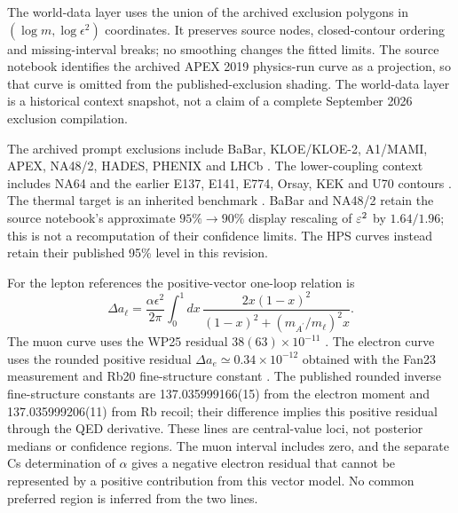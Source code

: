 The world-data layer uses the union of the archived exclusion polygons in
$(\log m,\log\epsilon^2)$ coordinates. It preserves source nodes, closed-contour
ordering and missing-interval breaks; no smoothing changes the fitted limits.
The source notebook identifies the archived APEX 2019 physics-run curve as
a projection, so that curve is omitted from the published-exclusion shading.
The world-data layer is a historical context snapshot, not a claim of a
complete September 2026 exclusion compilation.


The archived prompt exclusions include BaBar, KLOE/KLOE-2, A1/MAMI, APEX,
NA48/2, HADES, PHENIX and LHCb
\cite{BaBarDarkPhoton2014,KLOE2013,KLOE22015,A1MAMI2014,APEX2011,
NA48DarkPhoton2015,HADESDarkPhoton2014,PHENIXDarkPhoton2015,LHCbDarkPhoton2020}.
The lower-coupling context includes NA64 and the earlier E137, E141, E774,
Orsay, KEK and U70 contours
\cite{NA64DarkPhoton2018,NA64X17Visible2021,E137BeamDump1988,
E141BeamDump1987,E774BeamDump1991,OrsayBeamDump1989,KEKBeamDump1986,
U70DarkPhoton2014}. The thermal target is an inherited benchmark
\cite{EssigEtAl2011}. BaBar and NA48/2 retain the source notebook's
approximate $95\%\to90\%$ display rescaling of $\varepsilon^2$ by $1.64/1.96$;
this is not a recomputation of their confidence limits. The HPS curves
instead retain their published 95\% level in this revision.

For the lepton references the positive-vector one-loop relation is
\begin{equation}
 \Delta a_\ell=\frac{\alpha\epsilon^2}{2\pi}
 \int_0^1\!dx\,\frac{2x(1-x)^2}{(1-x)^2+(m_{A^\prime}/m_\ell)^2x}.
\end{equation}
The muon curve uses the WP25 residual $38(63)\times10^{-11}$
\cite{MuonWP2025}. The electron curve uses the rounded positive residual
$\Delta a_e\simeq0.34\times10^{-12}$ obtained with the Fan23 measurement and
Rb20 fine-structure constant \cite{ElectronFan2023,AlphaMorel2020}.
The published rounded inverse fine-structure constants are
137.035999166(15) from the electron moment and 137.035999206(11) from Rb recoil;
their difference implies this positive residual through the QED derivative.
These lines are central-value loci, not posterior medians or confidence
regions. The muon interval includes zero, and the separate Cs determination
of $\alpha$ gives a negative electron residual that cannot be represented by
a positive contribution from this vector model. No common preferred region
is inferred from the two lines.

